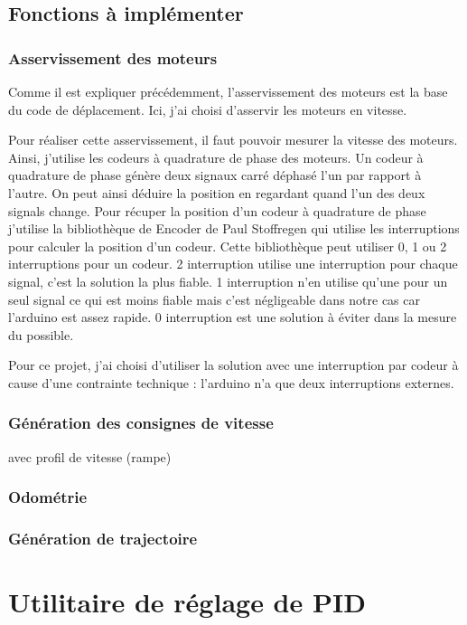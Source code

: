 \documentclass[12pt,a4paper]{report}
\begin{document}
    \subsection{Fonctions à implémenter}
      \subsubsection{Asservissement des moteurs}
        Comme il est expliquer précédemment, l'asservissement des moteurs est la base du code de déplacement. Ici, j'ai choisi d'asservir les moteurs en vitesse.

        Pour réaliser cette asservissement, il faut pouvoir mesurer la vitesse des moteurs. Ainsi, j'utilise les codeurs à quadrature de phase des moteurs.
        Un codeur à quadrature de phase génère deux signaux carré déphasé l'un par rapport à l'autre. On peut ainsi déduire la position en regardant quand l'un des deux signals change.
        Pour récuper la position d'un codeur à quadrature de phase j'utilise la bibliothèque de Encoder de Paul Stoffregen qui utilise les interruptions pour calculer la position d'un codeur. Cette bibliothèque peut utiliser 0, 1 ou 2 interruptions pour un codeur. 2 interruption utilise une interruption pour chaque signal, c'est la solution la plus fiable. 1 interruption n'en utilise qu'une pour un seul signal ce qui est moins fiable mais c'est négligeable dans notre cas car l'arduino est assez rapide. 0 interruption est une solution à éviter dans la mesure du possible.

        Pour ce projet, j'ai choisi d'utiliser la solution avec une interruption par codeur à cause d'une contrainte technique : l'arduino n'a que deux interruptions externes.
      \subsubsection{Génération des consignes de vitesse}
        avec profil de vitesse (rampe)
      \subsubsection{Odométrie}

      \subsubsection{Génération de trajectoire}

  \section{Utilitaire de réglage de PID}
\end{document}
